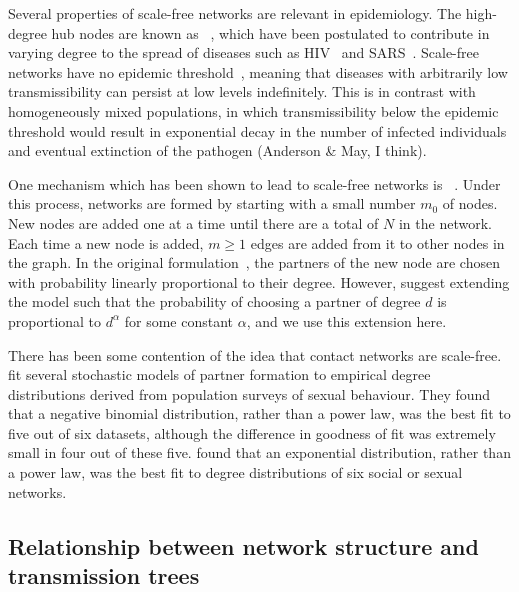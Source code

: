 Several properties of scale-free networks are relevant in epidemiology.  The
high-degree hub nodes are known as
~\autocite{kemper1980identification}, which have been
postulated to contribute in varying degree to the spread of diseases such as
\gls{HIV}~\autocite{stadler2013uncovering} and
\gls{SARS}~\autocite{shen2004superspreading}. Scale-free networks have no
epidemic threshold~\autocite{pastor2001epidemic}, meaning that diseases with
arbitrarily low transmissibility can persist at low levels indefinitely. This
is in contrast with homogeneously mixed populations, in which transmissibility
below the epidemic threshold would result in exponential decay in the number of
infected individuals and eventual extinction of the pathogen (Anderson \& May,
I think). 

One mechanism which has been shown to lead to scale-free networks is
~\autocite{simon1955class, barabasi1999emergence}.
Under this process, networks are formed by starting with a small number $m_0$
of nodes. New nodes are added one at a time until there are a total of $N$ in
the network. Each time a new node is added, $m \geq 1$ edges are added from it
to other nodes in the graph. In the original
formulation~\autocite{barabasi1999emergence}, the partners of the new node are
chosen with probability linearly proportional to their degree. However,
\citeauthor{barabasi1999emergence} suggest extending the model such that the
probability of choosing a partner of degree $d$ is proportional to $d^\alpha$
for some constant $\alpha$, and we use this extension here.

There has been some contention of the idea that contact networks are
scale-free. \textcite{handcock2004likelihood} fit several stochastic models of
partner formation to empirical degree distributions derived from population
surveys of sexual behaviour. They found that a negative binomial distribution,
rather than a power law, was the best fit to five out of six datasets, although
the difference in goodness of fit was extremely small in four out of these
five. \textcite{bansal2007individual} found that an exponential distribution,
rather than a power law, was the best fit to degree distributions of six social
or sexual networks. 

\subsection{Relationship between network structure and transmission trees}

